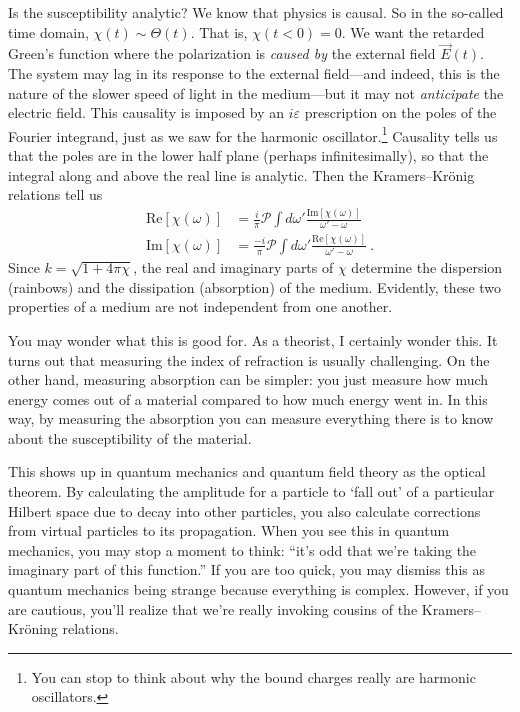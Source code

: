 Is the susceptibility analytic? We know that physics is causal. So in the so-called time domain, $\chi(t)\sim \Theta(t)$. That is, $\chi(t<0)=0$. We want the retarded Green's function where the polarization is \emph{caused by} the external field $\vec{E}(t)$. The system may lag in its response to the external field---and indeed, this is the nature of the slower speed of light in the medium---but it may not \emph{anticipate} the electric field. This causality is imposed by an $i\varepsilon$ prescription on the poles of the Fourier integrand, just as we saw for the harmonic oscillator.\footnote{You can stop to think about why the bound charges really are harmonic oscillators.} Causality tells us that the poles are in the lower half plane (perhaps infinitesimally), so that the integral along and above the real line is analytic. Then the Kramers--Kr\"onig relations tell us
\begin{align}
	\text{Re}\left[\chi(\omega)\right]
	&=
	\frac{i}{\pi} \mathcal P \int d\omega' \frac{\text{Im}\left[\chi(\omega)\right]}{\omega'-\omega}
	\\
	\text{Im}\left[\chi(\omega)\right]
	&=
	\frac{-i}{\pi} \mathcal P \int d\omega' \frac{\text{Re}\left[\chi(\omega)\right]}{\omega'-\omega} \ .
\end{align}
Since $k=\sqrt{1+4\pi\chi}$, the real and imaginary parts of $\chi$ determine the dispersion (rainbows) and the dissipation (absorption) of the medium. Evidently, these two properties of a medium are not independent from one another. 

\begin{example}
You may wonder what this is good for. As a theorist, I certainly wonder this. It turns out that measuring the index of refraction is usually challenging. On the other hand, measuring absorption can be simpler: you just measure how much energy comes out of a material compared to how much energy went in. In this way, by measuring the absorption you can measure everything there is to know about the susceptibility of the material.
\end{example}

\begin{example}
This shows up in quantum mechanics and quantum field theory as the optical theorem. By calculating the amplitude for a particle to `fall out' of a particular Hilbert space due to decay into other particles, you also calculate corrections from virtual particles to its propagation. When you see this in quantum mechanics, you may stop a moment to think: ``it's odd that we're taking the imaginary part of this function.'' If you are too quick, you may dismiss this as quantum mechanics being strange because everything is complex. However, if you are cautious, you'll realize that we're really invoking cousins of the Kramers--Kr\"oning relations.
\end{example}


